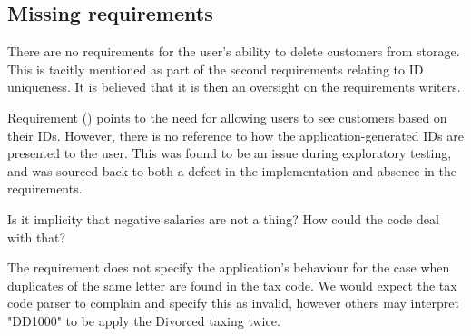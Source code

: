

\subsection{Missing requirements}

There are no requirements for the user's ability to delete customers from storage. This is tacitly mentioned as part of the second requirements relating to ID uniqueness. It is believed that it is then an oversight on the requirements writers. 
\par
Requirement (\RFour) points to the need for allowing users to see customers based on their IDs. However, there is no reference to how the application-generated IDs are presented to the user. This was found to be an issue during exploratory testing, and was sourced back to both a defect in the implementation and absence in the requirements. 
\par
Is it implicity that negative salaries are not a thing? How could the code deal with that? 
\par
The requirement does not specify the application's behaviour for the case when duplicates of the same letter are found in the tax code. We would expect the tax code parser to complain and specify this as invalid, however others may interpret "DD1000" to be apply the Divorced taxing twice. 





